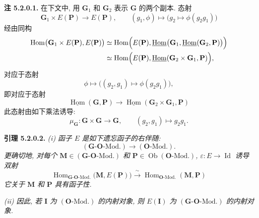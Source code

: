 \medskip
\noindent{}\textbf{注 5.2.0.1.}
在下文中, 用 \(\mathbf G_1\) 和 \(\mathbf G_2\) 表示
\(\mathbf G\) 的两个副本. 态射
\[
  \mathbf G_1\times E(\mathbf P)\longrightarrow E(\mathbf P),
  \qquad
  (g_1,\phi)\longmapsto\bigl(g_2\longmapsto\phi(g_2g_1)\bigr)
\]
经由同构
\begin{align*}
  \operatorname{Hom}\bigl(\mathbf G_1\times E(\mathbf P),E(\mathbf P)\bigr)
    &\simeq
      \operatorname{Hom}\Bigl(E(\mathbf P),
        \underline{\operatorname{Hom}}\bigl(
          \mathbf G_1,
          \underline{\operatorname{Hom}}(\mathbf G_2,\mathbf P)
        \bigr)\Bigr)\\
    &\simeq
      \operatorname{Hom}\Bigl(E(\mathbf P),
        \underline{\operatorname{Hom}}(
          \mathbf G_2\times\mathbf G_1,\mathbf P)
      \Bigr),
\end{align*}
对应于态射
\[
  \phi\longmapsto\bigl((g_2,g_1)\longmapsto\phi(g_2g_1)\bigr),
\]
即对应于态射
\[
  \underline{\operatorname{Hom}}(\mathbf G,\mathbf P)
    \longrightarrow
  \underline{\operatorname{Hom}}(\mathbf G_2\times\mathbf G_1,\mathbf P)
\]
此态射由如下乘法诱导:
\[
  \mu_{\mathbf G}:\mathbf G\times\mathbf G\longrightarrow\mathbf G,
  \qquad (g_2,g_1)\longmapsto g_2g_1.
\]

\medskip
\noindent{}\textbf{引理 5.2.0.2.}
\textit{(i) 函子 \(E\) 是如下遗忘函子的右伴随:
\[
  (\mathbf G\text{-}\mathbf O\text{-Mod.})
    \longrightarrow(\mathbf O\text{-Mod.}).
\]
更确切地, 对每个
\(\mathbf M\in(\mathbf G\text{-}\mathbf O\text{-Mod.})\) 和
\(\mathbf P\in\operatorname{Ob}(\mathbf O\text{-Mod.})\),
\(\varepsilon:E\to\operatorname{Id}\) 诱导双射}
\[
  \operatorname{Hom}_{\mathbf G\text{-}\mathbf O\text{-Mod.}}
    \bigl(\mathbf M,E(\mathbf P)\bigr)
  \xrightarrow{\ \sim\ }
  \operatorname{Hom}_{\mathbf O\text{-Mod.}}(\mathbf M,\mathbf P)
\]
\textit{它关于 \(\mathbf M\) 和 \(\mathbf P\) 具有函子性.}

\textit{(ii) 因此, 若 \(\mathbf I\) 为
\((\mathbf O\text{-Mod.})\) 的内射对象, 则 \(E(\mathbf I)\) 为
\((\mathbf G\text{-}\mathbf O\text{-Mod.})\) 的内射对象.}

